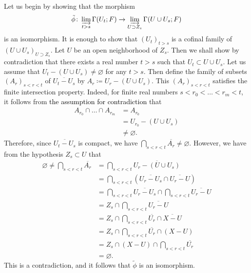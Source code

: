 ﻿\documentclass[a4paper,leqno,dvipdfmx]{jsarticle}
\makeatletter
\theoremstyle{definition}
\renewenvironment{proof}[1][\proofname]{\par
  \pushQED{\qed}%
  \normalfont \topsep6\p@\@plus6\p@\relax
  \trivlist
  \item[\hskip\labelsep
         \bfseries
    {#1}]\ignorespaces
}{%
  \popQED\endtrivlist\@endpefalse
}
\renewcommand{\proofname}{Proof.}
\numberwithin{equation}{section}
\newcommand{\indlim}[1][]{\mathop{\varinjlim}\limits_{#1}}
\theoremstyle{mystyle}
\makeatother
\begin{document}
\begin{proof}[Proof of Lemma \ref{clm:ind-nonchar}]
  Let us begin by showing that the morphism  
  \[
    \tilde{\phi}\colon\indlim[t>s]
    \Gamma(U_{t};F)
    \to 
    \indlim[U\supset Z_{s}]
    \Gamma(U\cup U_{s};F) 
  \]
  is an isomorphism. 
  It is enough to show that \(
    \left(U_{t}\right)_{t>s}
  \) is a cofinal family of \((U\cup U_{s})_{U\supset Z_{s}}\). 
  Let \(U\) be an open neighborhood of \(Z_{s}\). 
  Then we shall show by contradiction that 
  there exists a real number \(t>s\) such that 
  \(U_{t}\subset U\cup U_{s}\). 
  Let us assume that 
  \(U_{t}-(U\cup U_{s})\ne \varnothing\) 
  for any \(t>s\). 
  Then define the family of subsets \(
    \left(A_{r}\right)_{s<r<t}
  \) of \(\overline{U_{t}- U_{s}}\) by \(
    A_{r}\coloneqq U_{r}- (U\cup U_{s})
  \). 
  This \(\left(A_{r}\right)_{s<r<t}\) satisfies 
  the finite intersection property. 
  Indeed, for finite real numbers \(s<r_{0}<\dots<r_{m}<t\), 
  it follows from 
  \textcolor{black}{the assumption for contradiction}
  that
  \begin{align*}
    A_{r_{0}}\cap \dots \cap A_{r_{m}}
    &= A_{r_{0}}\\
    &= U_{r_{0}}- (U\cup U_{s})\\
    &\ne \varnothing.
  \end{align*}
  Therefore, since \(\overline{U_{t}- U_{s}}\) is 
  compact, we have \(\bigcap_{s<r<t}\overline{A_{r}}\ne\varnothing\). 
  However, 
  we have from the hypothesis \(Z_{s}\subset U\) that 
  \begin{align*}
    \varnothing 
    \ne
    \bigcap_{s<r<t}\overline{A_{r}}
    &=\bigcap_{s<r<t}\overline{U_{r}-(U\cup U_{s})}\\
    &=\bigcap_{s<r<t}(\overline{U_{r}- U_{s}}\cap \overline{U_{r} - U})\\
    &=\bigcap_{s<r<t}\overline{U_{r}- U_{s}}\cap \bigcap_{s<r<t}\overline{U_{r} - U}\\
    &=Z_{s}\cap \bigcap_{s<r<t}\overline{U_{r} - U}\\
    &=Z_{s}\cap \bigcap_{s<r<t}\overline{U_{r}}\cap \overline{X- U}\\
    &=Z_{s}\cap \bigcap_{s<r<t}\overline{U_{r}}\cap (X- U)\\
    &=Z_{s}\cap (X- U)\cap \bigcap_{s<r<t}\overline{U_{r}}\\
    &=\varnothing. 
  \end{align*}
  This is a contradiction, 
  and it follows that \(\tilde{\phi}\) is an isomorphism. 


\end{proof}
\end{document}
